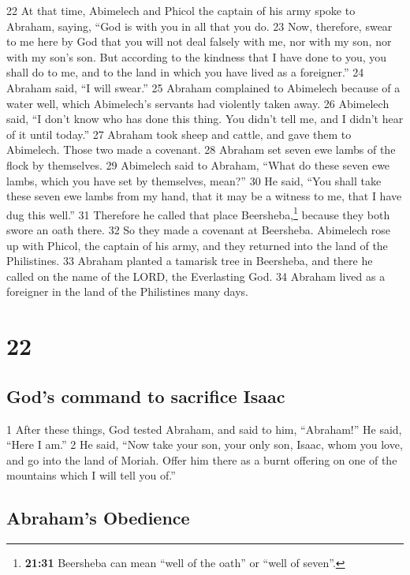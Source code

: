 {22} At that time, Abimelech and Phicol the captain of his army spoke to
Abraham, saying, ``God is with you in all that you do. {23} Now,
therefore, swear to me here by God that you will not deal falsely with
me, nor with my son, nor with my son's son. But according to the
kindness that I have done to you, you shall do to me, and to the land in
which you have lived as a foreigner.'' {24} Abraham said, ``I will
swear.'' {25} Abraham complained to Abimelech because of a water well,
which Abimelech's servants had violently taken away. {26} Abimelech
said, ``I don't know who has done this thing. You didn't tell me, and I
didn't hear of it until today.'' {27} Abraham took sheep and cattle, and
gave them to Abimelech. Those two made a covenant. {28} Abraham set
seven ewe lambs of the flock by themselves. {29} Abimelech said to
Abraham, ``What do these seven ewe lambs, which you have set by
themselves, mean?'' {30} He said, ``You shall take these seven ewe lambs
from my hand, that it may be a witness to me, that I have dug this
well.'' {31} Therefore he called that place Beersheba,\footnote{\textbf{21:31}
  Beersheba can mean ``well of the oath'' or ``well of seven''.} because
they both swore an oath there. {32} So they made a covenant at
Beersheba. Abimelech rose up with Phicol, the captain of his army, and
they returned into the land of the Philistines. {33} Abraham planted a
tamarisk tree in Beersheba, and there he called on the name of the LORD,
the Everlasting God. {34} Abraham lived as a foreigner in the land of
the Philistines many days.

\hypertarget{section-21}{%
\section{22}\label{section-21}}

\hypertarget{gods-command-to-sacrifice-isaac}{%
\subsection{God's command to sacrifice
Isaac}\label{gods-command-to-sacrifice-isaac}}

{1} After these things, God tested Abraham, and said to him,
``Abraham!'' He said, ``Here I am.'' {2} He said, ``Now take your son,
your only son, Isaac, whom you love, and go into the land of Moriah.
Offer him there as a burnt offering on one of the mountains which I will
tell you of.''

\hypertarget{abrahams-obedience}{%
\subsection{Abraham's Obedience}\label{abrahams-obedience}}

